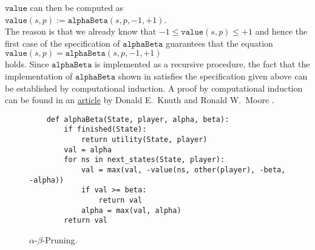 $\texttt{value}$ can then be computed as 
\\[0.2cm]
\hspace*{1.3cm}
$\texttt{value}(s, p ) := \texttt{alphaBeta}(s, p, -1, +1)$.
\\[0.2cm]
The reason is that we already know that $-1 \leq \texttt{value}(s,p) \leq +1$ and hence the first case of the
specification of $\texttt{alphaBeta}$ guarantees that the equation
\\[0.2cm]
\hspace*{1.3cm}
$\texttt{value}(s,p) = \texttt{alphaBeta}(s,p,-1,+1)$
\\[0.2cm]
holds.  Since $\texttt{alphaBeta}$ is implemented as a recursive procedure, 
the fact that the implementation of $\texttt{alphaBeta}$ shown in  satisfies the
specification given above can be established by computational induction.  A proof by computational induction
can be found in an
\href{https://pdfs.semanticscholar.org/dce2/6118156e5bc287bca2465a62e75af39c7e85.pdf}{article} by Donald
E.~Knuth and Ronald W.~Moore \cite{knuth:1975}. 



\begin{figure}[!ht]
\centering
\begin{verbatim}
    def alphaBeta(State, player, alpha, beta):
        if finished(State):
            return utility(State, player)
        val = alpha
        for ns in next_states(State, player):
            val = max(val, -value(ns, other(player), -beta, -alpha))
            if val >= beta:
                return val
            alpha = max(val, alpha)
        return val
\end{verbatim}
\caption{$\alpha$-$\beta$-Pruning.}
\label{fig:Alpha-Beta-Pruning.ipynb:alphaBeta}
\end{figure}

